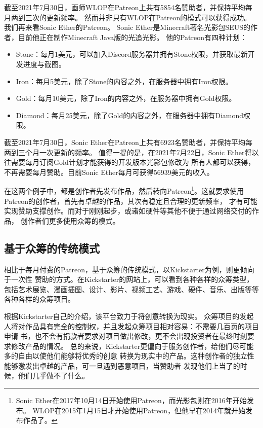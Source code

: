 \documentclass[11pt,UTF8,a4paper]{ctexart}
\begin{document}
    截至2021年7月30日，画师WLOP在Patreon上共有5854名赞助者，并保持平均每月两到三次的更新频率。
    然而并非只有WLOP在Patreon的模式可以获得成功。 我们再来看Sonic Ether的Patreon。
    Sonic Ether是Minecraft著名光影包SEUS的作者，目前他正在制作Minecraft Java版的光追光影。
    他的Patreon有四种计划\cite{seus_patreon}：
    \begin{itemize}
        \item Stone：每月1美元，可以加入Discord服务器并拥有Stone权限，并获取最新开发进度与截图。
        \item Iron：每月5美元，除了Stone的内容之外，在服务器中拥有Iron权限。
        \item Gold：每月10美元，除了Iron的内容之外，在服务器中拥有Gold权限。
        \item Diamond：每月25美元，除了Gold的内容之外，在服务器中拥有Diamond权限。
    \end{itemize}

    截至2021年7月30日，Sonic Ether在Patreon上共有6923名赞助者，并保持平均每两到三个月一次更新的频率。
    值得一提的是，在2021年7月22日，Sonic Ether将以往需要每月订阅Gold计划才能获得的开发版本光影包修改为
    所有人都可以获得，不再需要每月赞助。目前Sonic Ether每月可获得56939美元的收入。

    在这两个例子中，都是创作者先发布作品，然后转向Patreon\footnote{
        Sonic Ether在2017年10月14日开始使用Patreon，而光影包则在2016年开始发布。
        WLOP在2015年1月15日才开始使用Patreon，但他早在2014年就开始发布作品了。
    }。这就要求使用Patreon的创作者，首先有卓越的作品，其次有稳定且合理的更新频率，
    才有可能实现赞助支撑创作。而对于刚刚起步，或诸如硬件等其他不便于通过网络交付的作品，
    创作者们更多使用众筹的模式。

    \subsection{基于众筹的传统模式}\label{subsec:tradition_kickstarter}

    相比于每月付费的Patreon，基于众筹的传统模式，以Kickstarter为例，则更倾向于一次性
    赞助的方式。在Kickstarter的网站上，可以看到各种各样的众筹类型\cite{kickstarter_homepage}，
    包括艺术展览、漫画插图、设计、影片、视频工艺、游戏、硬件、音乐、出版等等各种各样的众筹项目。

    根据Kickstarter自己的介绍\cite{kickstarter_about}，该平台致力于将创意转换为现实。
    众筹项目的发起人将对作品具有完全的控制权，并且发起众筹项目相对容易：不需要几百页的项目申请
    书，也不会有捐款者要求对项目做出修改，更不会出现投资者在最终时刻要求修改产品的情况。
    总的来说，Kickstarter更偏向于服务创作者，给他们尽可能多的自由以使他们能够将优秀的创意
    转换为现实中的产品。这种创作者的独立性能够激发出卓越的产品，可一旦遇到恶意项目，当赞助者
    发现他们上当了的时候，他们几乎做不了什么。
\end{document}

